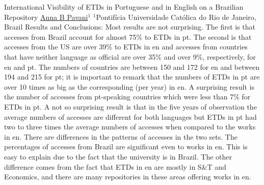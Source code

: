 \begin{abstract_online}{International Visibility of ETDs in Portuguese and in English on a Brazilian Repository}{%
        \underline{Anna B Pavani}$^{1}$}{%
        }{%
        $^1$Pontifícia Universidade Católica do Rio de Janeiro, Brazil}
         Results and Conclusions: Most results are not surprising. The first is that accesses from Brazil account for almost 75\% to ETDs in pt. The second is that accesses from the US are over 39\% to ETDs in en and accesses from countries that have neither language as official are over 35\% and over 9\%, respectively, for en and pt. The numbers of countries are between 150 and 172 for en and between 194 and 215 for pt; it is important to remark that the numbers of ETDs in pt are over 10 times as big as the corresponding (per year) in en. A surprising result is the number of accesses from pt-speaking countries which were less than 7\% for ETDs in pt. A not so surprising result is that in the five years of observation the average numbers of accesses are different for both languages but ETDs in pt had two to three times the average numbers of accesses when compared to the works in en.  There are differences in the patterns of accesses in the two sets. The percentages of accesses from Brazil are significant even to works in en. This is easy to explain due to the fact that the university is in Brazil. The other difference comes from the fact that ETDs in en are mostly in S\&T and Economics, and there are many repositories in these areas offering works in en.
    
    \end{abstract_online}
    
